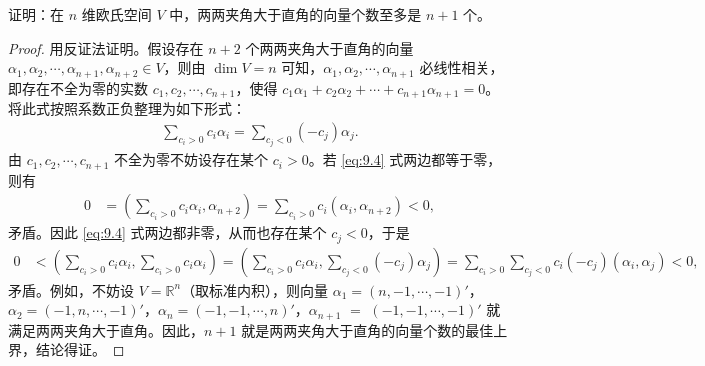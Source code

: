 \documentclass[../../main.tex]{subfiles}%
\begin{document}
\begin{proposition}\label{proposition:例9.6}
证明：在 $n$ 维欧氏空间 $V$ 中，两两夹角大于直角的向量个数至多是 $n + 1$ 个。
\end{proposition}
\begin{proof}

用反证法证明。假设存在 $n + 2$ 个两两夹角大于直角的向量 $\alpha_1,\alpha_2,\cdots,\alpha_{n + 1},\alpha_{n + 2}\in V$，则由 $\dim V = n$ 可知，$\alpha_1,\alpha_2,\cdots,\alpha_{n + 1}$ 必线性相关，即存在不全为零的实数 $c_1,c_2,\cdots,c_{n + 1}$，使得 $c_1\alpha_1 + c_2\alpha_2 + \cdots + c_{n + 1}\alpha_{n + 1} = 0$。将此式按照系数正负整理为如下形式：
\begin{align}
\sum_{c_i > 0}c_i\alpha_i = \sum_{c_j < 0}(-c_j)\alpha_j.\label{eq:9.4}
\end{align}
由 $c_1,c_2,\cdots,c_{n + 1}$ 不全为零不妨设存在某个 $c_i > 0$。若 \eqref{eq:9.4} 式两边都等于零，则有
\begin{align*}
0&=(\sum_{c_i > 0}c_i\alpha_i,\alpha_{n + 2})=\sum_{c_i > 0}c_i(\alpha_i,\alpha_{n + 2})<0,
\end{align*}
矛盾。因此 \eqref{eq:9.4} 式两边都非零，从而也存在某个 $c_j < 0$，于是
\begin{align*}
0&<(\sum_{c_i > 0}c_i\alpha_i,\sum_{c_i > 0}c_i\alpha_i)=(\sum_{c_i > 0}c_i\alpha_i,\sum_{c_j < 0}(-c_j)\alpha_j)=\sum_{c_i > 0}\sum_{c_j < 0}c_i(-c_j)(\alpha_i,\alpha_j)<0,
\end{align*}
矛盾。例如，不妨设 $V = \mathbb{R}^n$（取标准内积），则向量 $\alpha_1 = (n,-1,\cdots,-1)'$，$\alpha_2 = (-1,n,\cdots,-1)'$，$\alpha_n = (-1,-1,\cdots,n)'$，$\alpha_{n + 1}$ $=$ $(-1,-1,\cdots,-1)'$ 就满足两两夹角大于直角。因此，$n + 1$ 就是两两夹角大于直角的向量个数的最佳上界，结论得证。 

\end{proof}
\end{document}
